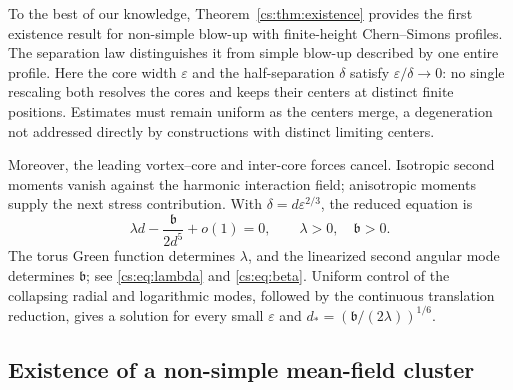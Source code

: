 \documentclass[11pt,reqno]{amsart}
\numberwithin{equation}{section}
\theoremstyle{definition}
\theoremstyle{remark}
\newcommand{\eps}{\varepsilon}
\begin{document}
To the best of our knowledge, Theorem~\ref{cs:thm:existence} provides
the first existence result for non-simple blow-up with finite-height
Chern--Simons profiles. The separation law distinguishes it from simple blow-up
described by one entire profile. Here the core width $\eps$ and the
half-separation $\delta$ satisfy $\eps/\delta\to0$: no single rescaling
both resolves the cores and keeps their centers at distinct finite
positions. Estimates must remain uniform as the centers merge, a
degeneration not addressed directly by constructions with distinct
limiting centers.

Moreover, the leading vortex--core and inter-core forces cancel.
Isotropic second moments vanish against the harmonic interaction field;
anisotropic moments supply the next stress contribution. With
$\delta=d\eps^{2/3}$, the reduced equation is
\[
 \lambda d-\frac{\mathfrak b}{2d^5}+o(1)=0,
 \qquad \lambda>0,\quad \mathfrak b>0.
\]
The torus Green function determines $\lambda$, and the linearized
second angular mode determines $\mathfrak b$; see
\eqref{cs:eq:lambda} and \eqref{cs:eq:beta}. Uniform control of the
collapsing radial and logarithmic modes, followed by the continuous
translation reduction, gives a solution for every small $\eps$ and
$d_*=(\mathfrak b/(2\lambda))^{1/6}$.
\subsection{Existence of a non-simple mean-field cluster}
\end{document}
